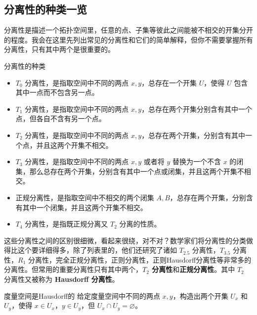 

\subsection{分离性的种类一览}

分离性是描述一个拓扑空间里，任意的点、子集等彼此之间能被不相交的开集分开的程度。我会在这里先列出常见的分离性和它们的简单解释，但你不需要掌握所有分离性，只有其中两个是很重要的。

\begin{definition}{分离性的种类}\label{def_Topo5_1}
\begin{itemize}

\item $T_0$ 分离性，是指取空间中不同的两点 $x,y$，总存在一个开集 $U$，使得 $U$ 包含其中一点而不包含另一点。
\item $T_1$ 分离性，是指取空间中不同的两点 $x,y$，总存在两个开集分别含有其中一个点，但各自不含有另一个点。
\item $T_2$ 分离性，是指取空间中不同的两点 $x,y$，总存在两个开集，分别含有其中一个点，并且这两个开集不相交。
\item $T_3$ 分离性，是指取空间中不同的两点 $x,y$ 或者将 $y$ 替换为一个不含 $x$ 的闭集，那么总存在两个开集，分别含有其中一个点或闭集，并且这两个开集不相交。
\item 正规分离性，是指取空间中不相交的两个闭集 $A, B$，总存在两个开集，分别含有其中一个闭集，并且这两个开集不相交。
\item $T_4$ 分离性，是指既正规分离又 $T_2$ 分离的性质。


\end{itemize}
\end{definition}

这些分离性之间的区别很细微，看起来很绕，对不对？数学家们将分离性的分类做得比这个要详细得多，除了列表里的，他们还研究了诸如 $T_{2.5}$ 分离性，$T_{3.5}$ 分离性，$R_1$ 分离性，完全正规分离性，正则分离性，正则Hausdorff分离性等非常多的分离性。但常用的重要分离性只有其中两个，\textbf{$T_2$ 分离性}和\textbf{正规分离性}。其中 $T_2$ 分离性又被称为 \textbf{Hausdorff 分离性}。

\begin{exercise}{度量空间是Hausdorff的}\label{exe_Topo5_1}
给定度量空间中不同的两点 $x, y$，构造出两个开集 $U_x$ 和 $U_y$，使得 $x\in U_x$，$y\in U_y$，但 $U_x\cap U_y=\varnothing$。
\end{exercise}

